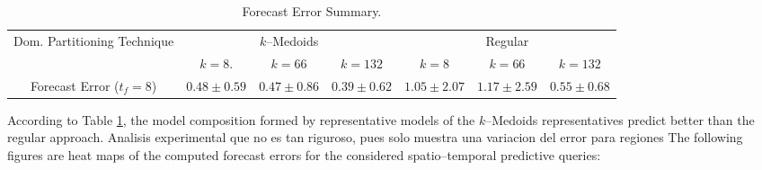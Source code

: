 \begin{table}[h!]
	\centering
	\tiny
	\begin{tabular}{|c|c|c|c|c|c|c|}
		\hline
		\multirow{2}{*}{Dom. Partitioning Technique} & \multicolumn{3}{c|}{$k$--Medoids} & \multicolumn{3}{c|}{Regular} \\
		\cline{2-7}
		& $k = 8$. & $k = 66$ & $k = 132$ & $k = 8$ & $k = 66$ & $k = 132$ \\
		\cline{2-7}
		\hline
		Forecast Error ($t_{f}=8$) & $0.48 \pm 0.59$ & $0.47 \pm 0.86$ & $0.39 \pm 0.62$ & $1.05 \pm 2.07$ & $1.17 \pm 2.59$ & $0.55 \pm 0.68$	 \\
		\hline
	\end{tabular}
	\caption{Forecast Error Summary.}
	\label{Table:Query10x10_kMedoids_Regular_StatSummary}
\end{table}

According to Table \ref{Table:Query10x10_kMedoids_Regular_StatSummary}, the model composition formed by representative models of the $k$--Medoids representatives predict better than the regular approach. Analisis experimental que no es tan riguroso, pues solo muestra una variacion del error para regiones 
The following figures are heat maps of the computed forecast errors for the considered spatio--temporal predictive queries:

